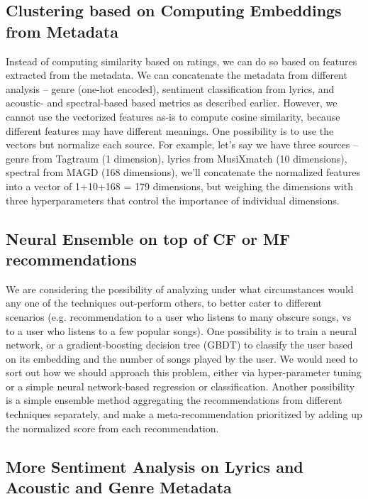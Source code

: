 \documentclass[10pt]{article}
\begin{document}
\subsection{Clustering based on Computing Embeddings from Metadata}

Instead of computing similarity based on ratings, we can do so based on features extracted from the metadata. We can concatenate the metadata from different analysis – genre (one-hot encoded), sentiment classification from lyrics, and acoustic- and spectral-based based metrics as described earlier. However, we cannot use the vectorized features as-is to compute cosine similarity, because different features may have different meanings. One possibility is to use the vectors but normalize each source. For example, let’s say we have three sources – genre from Tagtraum (1 dimension), lyrics from MusiXmatch (10 dimensions), spectral from MAGD (168 dimensions), we’ll concatenate the normalized features into a vector of 1+10+168 = 179 dimensions, but weighing the dimensions with three hyperparameters that control the importance of individual dimensions.

\subsection{
Neural Ensemble on top of CF or MF recommendations}

We are considering the possibility of analyzing under what circumstances would any one of the techniques out-perform others, to better cater to different scenarios (e.g. recommendation to a user who listens to many obscure songs, vs to a user who listens to a few popular songs). One possibility is to train a neural network, or a gradient-boosting decision tree (GBDT) to classify the user based on its embedding and the number of songs played by the user. We would need to sort out how we should approach this problem, either via hyper-parameter tuning or a simple neural network-based regression or classification. Another possibility is a simple ensemble method aggregating the recommendations from different techniques separately, and make a meta-recommendation prioritized by adding up the normalized score from each recommendation.

\subsection{More Sentiment Analysis on Lyrics and Acoustic and Genre Metadata}
\end{document}
